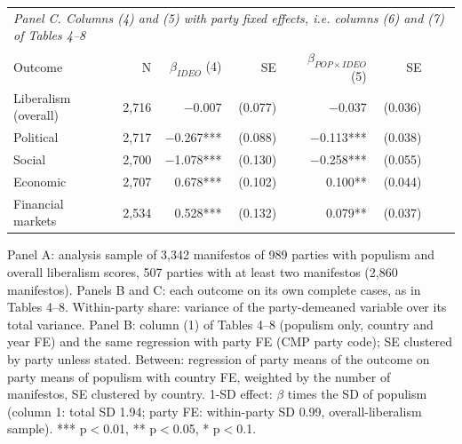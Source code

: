 \begin{table}[ht]
{\begin{tabular}{lrrrrrrr}
\midrule
\multicolumn{8}{l}{\emph{Panel C. Columns (4) and (5) with party fixed effects, i.e. columns (6) and (7) of Tables 4--8}} \\
Outcome & N & $\beta_{IDEO}$ (4) & SE & $\beta_{POP\times IDEO}$ (5) & SE & & \\
\midrule
Liberalism (overall) & 2,716 & $-$0.007 & (0.077) & $-$0.037 & (0.036) & & \\
Political & 2,717 & $-$0.267*** & (0.088) & $-$0.113*** & (0.038) & & \\
Social & 2,700 & $-$1.078*** & (0.130) & $-$0.258*** & (0.055) & & \\
Economic & 2,707 & 0.678*** & (0.102) & 0.100** & (0.044) & & \\
Financial markets & 2,534 & 0.528*** & (0.132) & 0.079** & (0.037) & & \\
\bottomrule
\end{tabular}}
\par\smallskip
\begin{minipage}{\linewidth}\scriptsize Panel A: analysis sample of 3,342 manifestos of 989 parties with populism and overall liberalism scores, 507 parties with at least two manifestos (2,860 manifestos). Panels B and C: each outcome on its own complete cases, as in Tables 4--8. Within-party share: variance of the party-demeaned variable over its total variance. Panel B: column (1) of Tables 4--8 (populism only, country and year FE) and the same regression with party FE (CMP party code); SE clustered by party unless stated. Between: regression of party means of the outcome on party means of populism with country FE, weighted by the number of manifestos, SE clustered by country. 1-SD effect: $\beta$ times the SD of populism (column 1: total SD 1.94; party FE: within-party SD 0.99, overall-liberalism sample). *** p$<$0.01, ** p$<$0.05, * p$<$0.1.\end{minipage}
\end{table}
